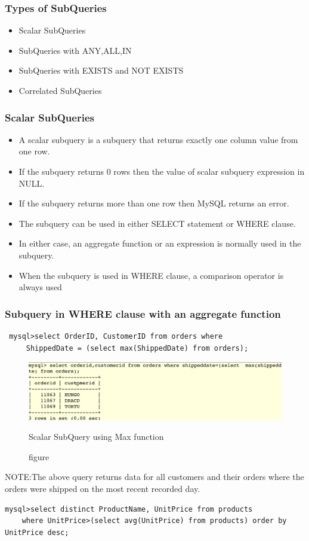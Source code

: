 \documentclass[11pt,a4paper]{article}
\begin{document}
\subsubsection*{Types of SubQueries}
\begin{itemize}
 \item Scalar SubQueries
 \item SubQueries with ANY,ALL,IN
 \item SubQueries with EXISTS and NOT EXISTS
 \item Correlated SubQueries
 \end{itemize}
\subsubsection*{Scalar SubQueries}
\begin{itemize}
 \item A scalar subquery is a subquery that returns exactly one column value from one row.
 \item If the subquery returns 0 rows then the value of scalar subquery expression in NULL.
 \item If the subquery returns more than one row then MySQL returns an error.
 \item The subquery can be used in either SELECT statement or WHERE clause.
 \item In either case, an aggregate function or an expression is normally used in the subquery.
 \item When the subquery is used in WHERE clause, a comparison operator is always used
\end{itemize}
\subsubsection*{Subquery in WHERE clause with an aggregate function}
\begin{verbatim}
 mysql>select OrderID, CustomerID from orders where 
     ShippedDate = (select max(ShippedDate) from orders);\end{verbatim}
\begin{figure}[ht]
\begin{center}
\includegraphics[scale=0.3]{max.png}
\caption{figure}{Scalar SubQuery using Max function}
\end{center}
\end{figure}  
NOTE:The above query returns data for all customers and their orders where the orders were shipped on the most recent recorded day.
\begin{verbatim}
mysql>select distinct ProductName, UnitPrice from products 
    where UnitPrice>(select avg(UnitPrice) from products) order by UnitPrice desc;\end{verbatim}
\end{document}
